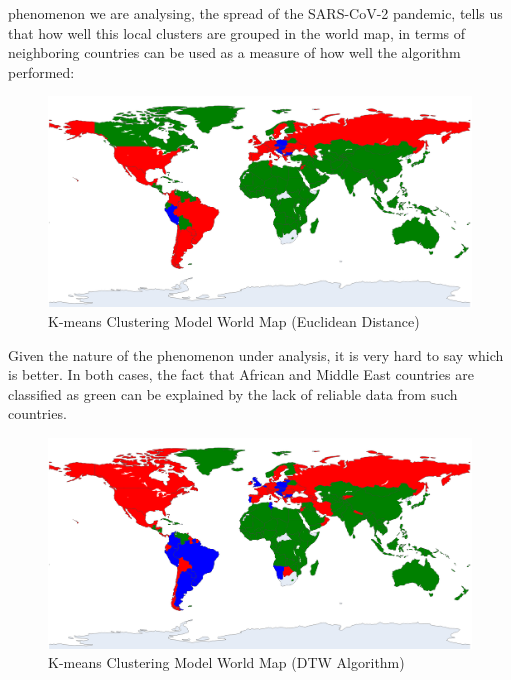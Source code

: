 \documentclass[11pt,a4paper]{article}
\begin{document}
phenomenon we are analysing, the spread of the SARS-CoV-2 pandemic, tells us
that how well this local clusters are grouped in the world map, in terms of
neighboring countries can be used as a measure of how well the algorithm
performed:
\begin{figure}[H]
    \begin{center}
        \includegraphics[scale=0.22]{img/euclidean-clusters-map.png}
    \end{center}
    \vspace{-0.2cm}
    \caption{K-means Clustering Model World Map (Euclidean Distance)}
\end{figure}
\noindent
Given the nature of the phenomenon under analysis, it is very hard to say which
is better. In both cases, the fact that African and Middle East countries are
classified as {\color{ForestGreen}green} can be explained by the lack of
reliable data from such countries.
\begin{figure}[H]
    \begin{center}
        \includegraphics[scale=0.22]{img/dtw-clusters-map.png}
    \end{center}
    \vspace{-0.2cm}
    \caption{K-means Clustering Model World Map (DTW Algorithm)}
\end{figure}
\end{document}
